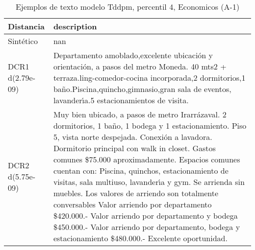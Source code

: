 \begin{table}[H]
\centering
\fontsize{10}{14}\selectfont
\caption{Ejemplos de texto modelo Tddpm, percentil 4, Economicos (A-1)}
\label{table-example-economicos-a-1-tddpm_mlp-4p-text}
\begin{tabular}{|l|m{35em}|}
\hline
\rowcolor[gray]{0.8}
Distancia & description \\
\hline Sintético & nan \\
\hline DCR1 d(2.79e-09) & Departamento amoblado,excelente ubicaci\'on y orientaci\'on, a pasos del metro Moneda. 40 mts2 + terraza.ling-comedor-cocina incorporada,2 dormitorios,1 ba\~no.Piscina,quincho,gimnasio,gran sala de eventos, lavander{\'\i}a.5 estacionamientos de visita. \\
\hline DCR2 d(5.75e-09) & Muy bien ubicado, a pasos de metro Irarr\'azaval.   2 dormitorios, 1 ba\~no, 1 bodega y 1 estacionamiento.  Piso 5, vista norte despejada.   Conexi\'on a lavadora.   Dormitorio principal con walk in closet.  Gastos comunes \$75.000 aproximadamente.   Espacios comunes cuentan con: Piscina, quinchos, estacionamiento de visitas, sala multiuso, lavander{\'\i}a y gym.  Se arrienda sin muebles.  Los valores de arriendo son totalmente conversables Valor arriendo por departamento \$420.000.- Valor arriendo por departamento y bodega \$450.000.- Valor arriendo por departamento, bodega y estacionamiento \$480.000.-  Excelente oportunidad. \\
\hline
\end{tabular}
\end{table}
